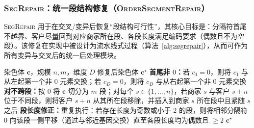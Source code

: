 \subsubsection{\textsc{SegRepair}：统一段结构修复（\textsc{OrderSegmentRepair}）}
\textsc{SegRepair} 用于在交叉/变异后恢复“段结构可行性”，其核心目标是：分隔符首尾不越界、客户尽量回到对应商家所在段、各段长度满足编码要求（偶数且不为空段）。该修复在实现中被设计为流水线式过程（算法~\ref{alg:segrepair}），从而可作为所有变异与交叉后的统一后处理模块。
\begin{algorithm}[H]
	\caption{SegRepair（\textsc{OrderSegmentRepair} 修复流水线框架）}
	\label{alg:segrepair}
	\begin{algorithmic}[1]
		\REQUIRE 染色体 $\mathbf{c}$，规模 $n,m$，维度 $D$
		\ENSURE 修复后染色体 $\mathbf{c}^\star$
		\STATE \textbf{首尾非 $0$：}若 $c_1=0$，则将 $c_1$ 与从左起第一个非 $0$ 元素交换；若 $c_D=0$，则将 $c_D$ 与从右起第一个非 $0$ 元素交换
		\STATE \textbf{对不跨段：}按 $0$ 将 $\mathbf{c}$ 切分为 $m$ 段；对每个 $s\in\{1,\ldots,n\}$，若商家 $s$ 与客户 $s{+}n$ 位于不同段，则将客户 $s{+}n$ 从其所在段移除，并插入到商家 $s$ 所在段中且紧随 $s$ 之后
		\STATE \textbf{段长度修正：}重复执行：若存在长度为奇数或小于 $2$ 的段，则将相邻分隔符 $0$ 向该段一侧平移（通过与邻近基因交换）直至各段长度均为偶数且 $\ge 2$
		\RETURN $\mathbf{c}^\star$
	\end{algorithmic}
\end{algorithm}
